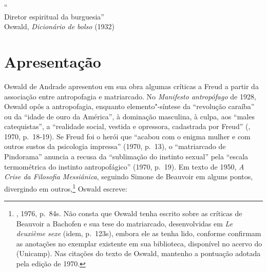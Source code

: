 \begin{flushright}
\footnotesize
``\\
Diretor espiritual da burguesia''\\
Oswald, \emph{Dicionário de bolso} (1932)
\end{flushright}

\section{Apresentação}

Oswald de Andrade apresentou em sua obra algumas críticas a Freud a
partir da associação entre antropofagia e matriarcado. No
\emph{Manifesto antropófago} de 1928, Oswald opôs a antropofagia,
enquanto elemento"-síntese da ``revolução caraíba'' ou da ``idade de ouro
da América'', à dominação masculina, à culpa, aos ``males catequistas'',
a ``realidade social, vestida e opressora, cadastrada por
Freud'' (, 1970, p.~18-19). Se Freud foi o herói que
``acabou com o enigma mulher e com outros sustos da psicologia
impressa'' (1970, p.~13), o ``matriarcado de Pindorama'' anuncia
a recusa da ``sublimação do instinto sexual'' pela ``escala termométrica
do instinto antropofágico'' (1970, p.~19). Em texto de 1950,
\emph{A Crise da Filosofia Messiânica}, seguindo Simone de Beauvoir em
alguns pontos, divergindo em outros,\footnote{, 1976, p.~84s.
  Não consta que Oswald tenha escrito sobre as críticas de Beauvoir a
  Bachofen e sua tese do matriarcado, desenvolvidas em \emph{Le deuxième
  sexe} (idem, p.~123s), embora ele as tenha lido, conforme confirmam as
  anotações no exemplar existente em sua biblioteca, disponível no
  acervo do  (Unicamp). Nas citações do texto de Oswald, mantenho a
  pontuação adotada pela edição de 1970.} Oswald escreve:

